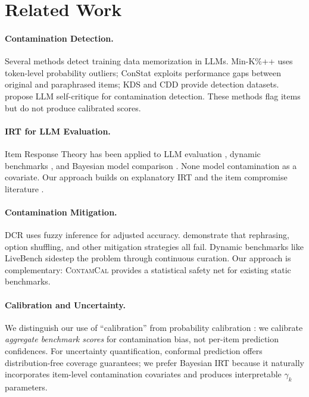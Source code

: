 \documentclass[11pt,a4paper]{article}
\newcommand{\contamcal}{\textsc{ContamCal}}
\begin{document}
\section{Related Work}
\label{sec:related}

\paragraph{Contamination Detection.}
Several methods detect training data memorization in LLMs.
Min-K\%++ \citep{shi2024detecting} uses token-level probability outliers; ConStat \citep{dekoninck2024constat} exploits performance gaps between original and paraphrased items; KDS \citep{zhang2024kds} and CDD \citep{li2024cdd} provide detection datasets.
\citet{yang2023rethinking} propose LLM self-critique for contamination detection.
These methods flag items but do not produce calibrated scores.

\paragraph{IRT for LLM Evaluation.}
Item Response Theory has been applied to LLM evaluation \citep{lalor2024benchmarking,polo2024tinybenchmarks}, dynamic benchmarks \citep{white2024livebench}, and Bayesian model comparison \citep{zhuang2024hibayes}.
None model contamination as a covariate.
Our approach builds on explanatory IRT \citep{deboeck2004explanatory,adams1997multidimensional} and the item compromise literature \citep{eckerly2017detecting,sinharay2017use}.

\paragraph{Contamination Mitigation.}
DCR \citep{dong2024generalization} uses fuzzy inference for adjusted accuracy.
\citet{xu2024benchmark} demonstrate that rephrasing, option shuffling, and other mitigation strategies all fail.
Dynamic benchmarks like LiveBench \citep{white2024livebench} sidestep the problem through continuous curation.
Our approach is complementary: \contamcal{} provides a statistical safety net for existing static benchmarks.

\paragraph{Calibration and Uncertainty.}
We distinguish our use of ``calibration'' from probability calibration \citep{guo2017calibration,platt1999probabilistic}: we calibrate \emph{aggregate benchmark scores} for contamination bias, not per-item prediction confidences.
For uncertainty quantification, conformal prediction \citep{angelopoulos2023conformal} offers distribution-free coverage guarantees; we prefer Bayesian IRT because it naturally incorporates item-level contamination covariates and produces interpretable $\gamma_k$ parameters.
\end{document}
